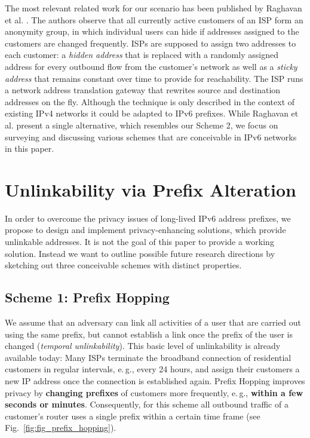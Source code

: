 \documentclass{easychair}
\begin{document}
The most relevant related work for our scenario has been published by Raghavan et al. \cite{Enlisting-ISPs}. The authors observe that all currently active customers of an ISP form an anonymity group, in which individual users can hide if addresses assigned to the customers are changed frequently. ISPs are supposed to assign two addresses to each customer: a \emph{hidden address} that is replaced with a randomly assigned address for every outbound flow from the customer's network as well as a \emph{sticky address} that remains constant over time to provide for reachability. The ISP runs a network address translation gateway that rewrites source and destination addresses on the fly. Although the technique is only described in the context of existing IPv4 networks it could be adapted to IPv6 prefixes. While Raghavan et al. present a single alternative, which resembles our Scheme 2, we focus on surveying and discussing various schemes that are conceivable in IPv6 networks in this paper.



\section{Unlinkability via Prefix Alteration}
\label{sec:alteration}

In order to overcome  the privacy issues of long-lived  IPv6 address prefixes, we propose to design and implement privacy-enhancing solutions, which provide unlinkable addresses. It is not the goal of this paper to provide a working solution. Instead we want to outline possible future research directions by sketching out three conceivable schemes with distinct properties.

\subsection{Scheme 1: Prefix Hopping}

We assume that an adversary can link all activities of a user that are carried out using the same prefix, but cannot establish a link once the prefix of the user is changed (\emph{temporal unlinkability}). This basic level of unlinkability is already available today: Many ISPs terminate the broadband connection of residential customers in regular intervals, e.\,g., every 24 hours, and assign their customers a new IP address once the connection is established again. Prefix Hopping improves privacy by \textbf{changing prefixes} of customers more frequently, e.\,g., \textbf{within a few seconds or minutes}.  Consequently, for this scheme all outbound traffic of a customer's router uses a single prefix within a certain time frame (see Fig.~\ref{fig:fig_prefix_hopping}).
\end{document}
